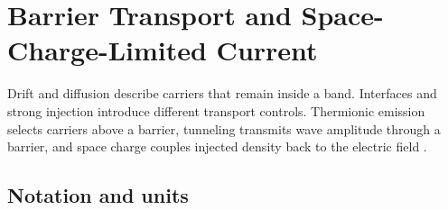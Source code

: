 \chapter{Barrier Transport and Space-Charge-Limited Current}
\label{ch:barrier-space-charge-transport}

Drift and diffusion describe carriers that remain inside a band.  Interfaces and
strong injection introduce different transport controls.  Thermionic emission
selects carriers above a barrier, tunneling transmits wave amplitude through a
barrier, and space charge couples injected density back to the electric field
\cite[Chap.~2]{szeLee2012}.

\section{Notation and units}

